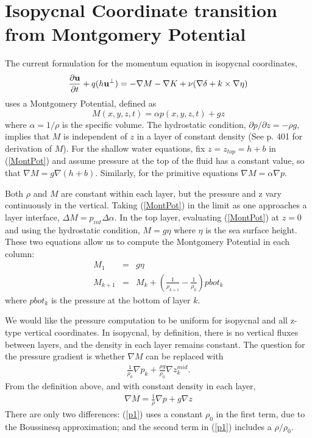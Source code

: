 \documentclass[11pt]{report}
\newcommand{\bea}{\begin{eqnarray}}
\newcommand{\eea}{\end{eqnarray}}
\begin{document}
\section{Isopycnal Coordinate transition from Montgomery Potential}
The current formulation for the momentum equation in isopycnal coordinates,
\begin{equation}
\label{continuous_velocity_pv2}
\frac{\partial {\bf u}}{\partial t} + q (h{\bf u^{\perp}}) 
  = - \nabla M  - \nabla K
   +\nu(\nabla \delta + k\times \nabla \eta)
\end{equation}
uses a  Montgomery Potential, defined as
\begin{equation}
\label{MontPot}
M(x,y,z,t) = \alpha p(x,y,z,t) + gz
\end{equation}
where $\alpha=1/\rho$ is the specific volume.  The hydrostatic condition, 
$\partial p/\partial z = -\rho g$, 
implies that $M$ is independent of $z$ in a layer of constant density (See \cite{Higdon06xacta} p. 401 for derivation of $M$).  For the shallow water equations, fix $z=z_{top}=h+b$ in (\ref{MontPot}) and assume pressure at the top of the fluid has a constant value, so that 
$\nabla M = g \nabla (h+b)$.  Similarly, for the primitive equations $\nabla M = \alpha \nabla p$.

Both $\rho$ and $M$ are constant within each layer, but the pressure and z vary continuously in the vertical.  Taking (\ref{MontPot}) in the limit as one approaches a layer interface, $\Delta M =  p_{int} \Delta \alpha$.  In the top layer, evaluating (\ref{MontPot}) at $z=0$ and using the hydrostatic condition, $M=g\eta$ where $\eta$ is the sea surface height.  These two equations allow us to compute the Montgomery Potential in each column:
\begin{eqnarray}
M_1 &=& g\eta \\
M_{k+1} &=& M_k + \left( \frac{1}{\rho_{k+1}} - \frac{1}{\rho_{k}}\right) pbot_k
\end{eqnarray}
where $pbot_k$ is the pressure at the bottom of layer $k$.

We would like the pressure computation to be uniform for isopycnal and all z-type vertical coordinates.  In isopycnal, by definition, there is no vertical fluxes between layers, and the density in each layer remains constant.  The question for the pressure gradient is whether $\nabla M$ can be replaced with 
\bea
 \frac{1}{\rho_0}\nabla p_k  + \frac{\rho g}{\rho_0}\nabla z^{mid}_k. \label{p1}
\eea
From the definition above, and with constant density in each layer,
\bea
\nabla M = \frac{1}{\rho} \nabla p + g\nabla z \label{p2}
\eea
There are only two differences:  (\ref{p1}) uses a constant $\rho_0$ in the first term, due to the Boussinesq approximation; and the second term in (\ref{p1}) includes a $\rho/\rho_0$.
\end{document}
